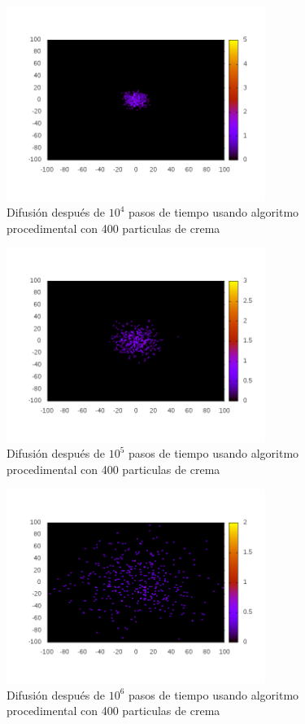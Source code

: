 \documentclass[12pt,twocolumn]{article}
\begin{document}
\begin{figure}\label{fig:t1e4}
    \centering
    \includegraphics[width=0.75\textwidth]{figs/t_1e4.png}
    \caption{Difusión después de $10^4$ pasos de tiempo usando 
        algoritmo procedimental con 400 particulas de crema}
\end{figure}

\begin{figure}\label{fig:t1e5}
    \centering
    \includegraphics[width=0.75\textwidth]{figs/t_1e5.png}
    \caption{Difusión después de $10^5$ pasos de tiempo usando 
        algoritmo procedimental con 400 particulas de crema}
\end{figure}

\begin{figure}\label{fig:t1e6}
    \centering
    \includegraphics[width=0.75\textwidth]{figs/t_1e6.png}
    \caption{Difusión después de $10^6$ pasos de tiempo usando 
        algoritmo procedimental con 400 particulas de crema}
\end{figure}
\end{document}
